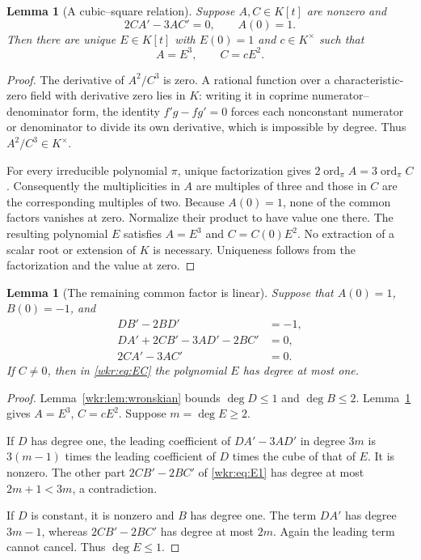 \documentclass[11pt,a4paper]{article}
\numberwithin{equation}{section}
\newtheorem{lemma}[theorem]{Lemma}
\theoremstyle{definition}
\theoremstyle{remark}
\begin{document}
\begin{lemma}[A cubic--square relation]\label{wkr:lem:powers}
Suppose $A,C\in K[t]$ are nonzero and
\begin{equation}\label{wkr:eq:powers}
2CA'-3AC'=0,\qquad A(0)=1.
\end{equation}
Then there are unique $E\in K[t]$ with $E(0)=1$ and $c\in K^\times$ such
that
\begin{equation}\label{wkr:eq:EC}
A=E^3,\qquad C=cE^2.
\end{equation}
\end{lemma}
\begin{proof}
The derivative of $A^2/C^3$ is zero. A rational function over a
characteristic-zero field with derivative zero lies in $K$: writing it in
coprime numerator--denominator form, the identity $f'g-fg'=0$ forces each
nonconstant numerator or denominator to divide its own derivative, which
is impossible by degree. Thus $A^2/C^3\in K^\times$.

For every irreducible polynomial $\pi$, unique factorization gives
$2\operatorname{ord}_\pi A=3\operatorname{ord}_\pi C$. Consequently the
multiplicities in $A$ are multiples of three and those in $C$ are the
corresponding multiples of two. Because $A(0)=1$, none of the common
factors vanishes at zero. Normalize their product to have value one there.
The resulting polynomial $E$ satisfies $A=E^3$ and $C=C(0)E^2$.
No extraction of a scalar root or extension of $K$ is necessary.
Uniqueness follows from the factorization and the value at zero.
\end{proof}

\begin{lemma}[The remaining common factor is linear]\label{wkr:lem:Edegree}
Suppose that $A(0)=1$, $B(0)=-1$, and
\begin{align}
DB'-2BD'&=-1,\label{wkr:eq:E0}\\
DA'+2CB'-3AD'-2BC'&=0,\label{wkr:eq:E1}\\
2CA'-3AC'&=0.\label{wkr:eq:E2}
\end{align}
If $C\ne0$, then in \eqref{wkr:eq:EC} the polynomial $E$ has degree at most
one.
\end{lemma}
\begin{proof}
Lemma~\ref{wkr:lem:wronskian} bounds $\deg D\le1$ and $\deg B\le2$.
Lemma~\ref{wkr:lem:powers} gives $A=E^3$, $C=cE^2$. Suppose $m=\deg E\ge2$.

If $D$ has degree one, the leading coefficient of $DA'-3AD'$ in degree
$3m$ is $3(m-1)$ times the leading coefficient of $D$ times the cube of
that of $E$. It is nonzero. The other part $2CB'-2BC'$ of \eqref{wkr:eq:E1}
has degree at most $2m+1<3m$, a contradiction.

If $D$ is constant, it is nonzero and $B$ has degree one. The term $DA'$
has degree $3m-1$, whereas $2CB'-2BC'$ has degree at most $2m$.
Again the leading term cannot cancel. Thus $\deg E\le1$.
\end{proof}
\end{document}
